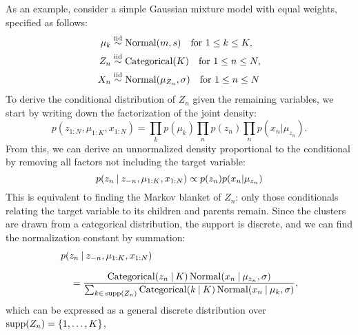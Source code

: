 As an example, consider a simple Gaussian mixture model with equal weights, specified as follows:
\begin{equation}
  \label{eq:normal-mixture-1}
  \begin{aligned}
    \mu_{k} &\stackrel{\text{iid}}{\sim} \mathrm{Normal}(m, s) \quad\text{for } 1 \le k \le K, \\
    Z_{n} &\stackrel{\text{iid}}{\sim} \mathrm{Categorical}(K) \quad\text{for } 1 \le n \le N, \\
    X_{n} &\stackrel{\text{iid}}{\sim} \mathrm{Normal}(\mu_{Z_{n}}, \sigma) \quad\text{for } 1 \le n \le N
  \end{aligned}
\end{equation}
To derive the conditional distribution of \(Z_{n}\) given the remaining variables, we start by
writing down the factorization of the joint density:
\begin{equation}
  p(z_{1:N}, \mu_{1:K}, x_{1:N}) = \prod_{k} p(\mu_{k}) \prod_{n} p(z_{n}) \prod_{n} p(x_{n} | \mu_{z_{n}}).
\end{equation}
From this, we can derive an unnormalized density proportional to the conditional by removing all
factors not including the target variable:
\begin{equation}
    p(z_{n} \:\vert\: z_{-n}, \mu_{1:K}, x_{1:N}) \propto p(z_{n}) p(x_{n} | \mu_{z_{n}})
\end{equation}
This is equivalent to finding the Markov blanket of \(Z_{n}\): only those conditionals relating the
target variable to its children and parents remain.  Since the clusters are drawn from a categorical
distribution, the support is discrete, and we can find the normalization constant by summation:
\begin{equation}
  \setlength{\jot}{0.8\baselineskip}
  \begin{aligned}
    &p(z_{n} \given z_{-n}, \mu_{1:K}, x_{1:N}) \\
    &\quad = \dfrac{\distr{Categorical}(z_{n} \given K) \, \Normal(x_{n} \given \mu_{z_{n}}, \sigma)}{
      \sum_{k \in\, \supp(Z_{n})} \distr{Categorical}(k \given K)\, \Normal(x_{n} \given \mu_{k},
      \sigma)}, \\
  \end{aligned}
\end{equation}
which can be expressed as a general discrete distribution over \(\operatorname{supp}(Z_{n}) = \{1, \ldots, K\}\),
